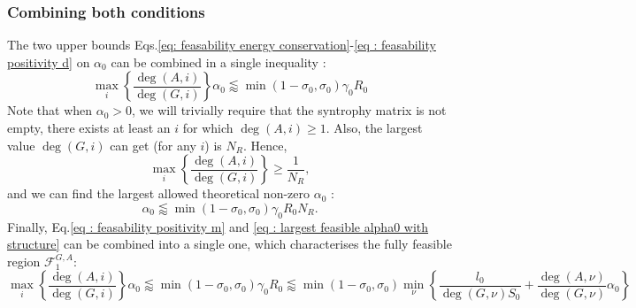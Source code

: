 \documentclass[12pt, titlepage]{report}
\begin{document}
\subsubsection{Combining both conditions}
The two upper bounds Eqs.\eqref{eq: feasability energy conservation}-\eqref{eq : feasability positivity d} on $\alpha_0$ can be combined in a single inequality :
\begin{equation} \label{eq : largest feasible alpha0 with structure}
\max_i\left\{\frac{\deg(A,i)}{\deg(G,i)}\right\} \alpha_0 \lessapprox \min(1-\sigma_0, \sigma_0) \gamma_0 R_0
\end{equation}
Note that when $\alpha_0 > 0$, we will trivially require that the syntrophy matrix is not empty, \ie there exists at least an $i$ for which $\deg(A,i) \geq 1$. Also, the largest value $\deg(G,i)$ can get (for any $i$) is $N_R$. Hence,
\begin{equation}
\max_i\left\{ \frac{\deg(A,i)}{\deg(G,i)} \right\} \geq \frac{1}{N_R},
\end{equation}
and we can find the largest allowed theoretical non-zero $\alpha_0$ :
\begin{equation}
\boxed{
\alpha_0 \lessapprox \min(1-\sigma_0, \sigma_0) \gamma_0 R_0 N_R. \label{eq : largest feasible alpha0}
}
\end{equation}
Finally, Eq.\eqref{eq : feasability positivity m} and \eqref{eq : largest feasible alpha0 with structure} can be combined into a single one, which characterises the fully feasible region $\mathcal{F}^{G,A}_1$:
\begin{equation}
\boxed{
\max_i\left\{\frac{\deg(A,i)}{\deg(G,i)}\right\} \alpha_0
\lessapprox \min(1-\sigma_0, \sigma_0) \gamma_0 R_0
\lessapprox
\min \left(1-\sigma_0, \sigma_0 \right) \min_\nu \left\{ \frac{l_0}{\deg(G,\nu) S_0} + \frac{\deg(A,\nu)}{\deg(G,\nu)}\alpha_0\right\}
}\label{eq : fully feasible volume}
\end{equation}
\end{document}
